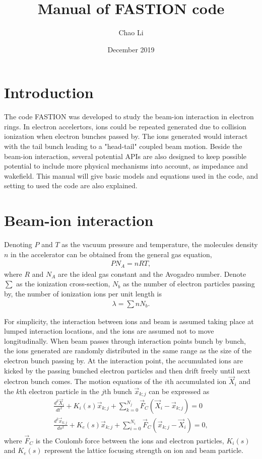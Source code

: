 \documentclass[aps,prab,reprint,superscriptaddress,showpacs,showkeys,letter]{revtex4-1}
\begin{document}
\title{Manual of FASTION code}
\author{Chao Li }
\date{December 2019}



\maketitle

\section{Introduction}
The code FASTION was developed to study the beam-ion interaction in electron rings. In electron accelertors, ions could be repeated generated due to collision ionization when  electron bunches passed by. The ions generated would interact with the tail bunch leading to a "head-tail" coupled beam motion. Beside the beam-ion interaction, several potential APIs are also designed to keep possible potential to include more physical mechanisms into account, as impedance and wakefield.   
This manual will  give basic models and equations used in the code, and setting to used the code are also explained.     

\section{Beam-ion interaction}
Denoting $P$ and $T$ as the vacuum pressure and temperature, the molecules density $n$ in the accelerator can be obtained from the general gas equation, 
\begin{eqnarray}
\label{eq2.1}
P N_A= nRT,
\end{eqnarray}
where $R$ and $N_A$ are the ideal gas constant and the Avogadro number. Denote $\sum$ as the ionization cross-section, $N_b$ as the number of electron particles passing by, the number of ionization ions per unit length is 
\begin{eqnarray}
\label{e2.2}
\lambda = \sum n N_b.
\end{eqnarray}

For simplicity, the interaction between ions and beam is assumed taking place at lumped interaction locations, and the ions are assumed not to move longitudinally. 
When beam passes through interaction points bunch by bunch, the ions generated  are randomly distributed  in the same range as the size of the electron bunch passing by. At the interaction point, the accumulated ions are kicked by the passing bunched electron particles and then drift freely until next electron bunch comes.  The motion equations of the $i$th accumulated ion $\vec X_i$ and the $k$th electron particle in the $j$th bunch $\vec x_{k;j}$ can be expressed as
\begin{eqnarray}
\label{eq2.3}
\frac{d^2\vec X_i}{dt^2} +K_i(s) \vec x_{k;j} + \sum_{k=0}^{N_j} \vec F_C(\vec X_i - \vec x_{k;j}) =0 \nonumber  \\
\frac{d^2\vec x_{k;j}}{ds^2} + K_e(s) \vec x_{k;j} +\sum_{i=0}^{N_i} \vec F_C(\vec x_{k;j} - \vec X_i ) =0,
\end{eqnarray}
where $\vec F_C$ is the Coulomb force between the ions and electron particles, $K_i(s)$ and $ K_e(s)$ represent the lattice focusing strength on ion and beam particle.
\end{document}
